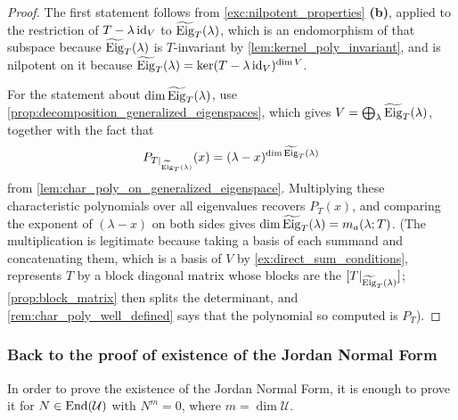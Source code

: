 \begin{proof}
The first statement follows from \cref{exc:nilpotent_properties} \textbf{(b)}, applied to the restriction of $T - \lambda \operatorname{id}_V$ to $\widetilde{\operatorname{Eig}}_T(\lambda)$, which is an endomorphism of that subspace because $\widetilde{\operatorname{Eig}}_T(\lambda)$ is $T$-invariant by \cref{lem:kernel_poly_invariant}, and is nilpotent on it because $\widetilde{\operatorname{Eig}}_T(\lambda) = \ker(T - \lambda \operatorname{id}_V)^{\dim V}$.

For the statement about $\dim \widetilde{\operatorname{Eig}}_T(\lambda)$, use \cref{prop:decomposition_generalized_eigenspaces}, which gives $V = \bigoplus_\lambda \widetilde{\operatorname{Eig}}_T(\lambda)$, together with the fact that
\[
    P_{T|_{\widetilde{\operatorname{Eig}}_T(\lambda)}}(x) = (\lambda - x)^{\dim \widetilde{\operatorname{Eig}}_T(\lambda)}
\]
from \cref{lem:char_poly_on_generalized_eigenspace}. Multiplying these characteristic polynomials over all eigenvalues recovers $P_T(x)$, and comparing the exponent of $(\lambda - x)$ on both sides gives $\dim \widetilde{\operatorname{Eig}}_T(\lambda) = m_a(\lambda; T)$. (The multiplication is legitimate because taking a basis of each summand and concatenating them, which is a basis of $V$ by \cref{ex:direct_sum_conditions}, represents $T$ by a block diagonal matrix whose blocks are the $[T|_{\widetilde{\operatorname{Eig}}_T(\lambda)}]$; \cref{prop:block_matrix} then splits the determinant, and \cref{rem:char_poly_well_defined} says that the polynomial so computed is $P_T$).
\end{proof}

\subsubsection*{Back to the proof of existence of the Jordan Normal Form}

\begin{claim}
\label{claim:reduction_to_nilpotent}
In order to prove the existence of the Jordan Normal Form, it is enough to prove it for $N \in \operatorname{End}(\mathcal{U})$ with $N^m = 0$, where $m = \dim \mathcal{U}$.
\end{claim}

